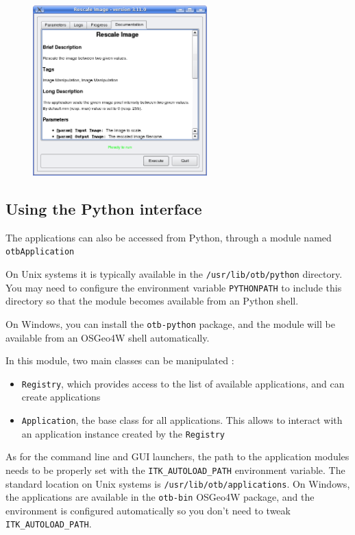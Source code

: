 \begin{figure}[h]
  \center
  \includegraphics[width=0.6\textwidth]{../Art/QtImages/rescale_documentation.png}
  \label{fig:rescaleDocumentation}
\end{figure}

\clearpage

\subsection{Using the Python interface}

The applications can also be accessed from Python, through a module named \verb?otbApplication?

On Unix systems it is typically available in the \verb?/usr/lib/otb/python? directory.
You may need to configure the environment variable \verb?PYTHONPATH? to include this directory
so that the module becomes available from an Python shell.

On Windows, you can install the \verb?otb-python? package, and the module will be available from
an OSGeo4W shell automatically.

In this module, two main classes can be manipulated :
\begin{itemize}
\item \verb?Registry?, which provides access to the list of available applications,
      and can create applications
\item \verb?Application?, the base class for all applications. This allows to interact with an application instance
      created by the \verb?Registry?
\end{itemize}

As for the command line and GUI launchers, the path to the application modules needs to
be properly set with the \verb?ITK_AUTOLOAD_PATH? environment variable.
The standard location on Unix systems is \verb?/usr/lib/otb/applications?.
On Windows, the applications are available in the \verb?otb-bin? OSGeo4W package, and
the environment is configured automatically so you don't need to tweak \verb?ITK_AUTOLOAD_PATH?.


